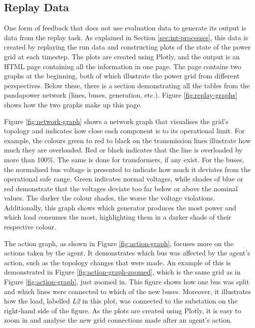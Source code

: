 \subsection{Replay Data}\label{ssec:replay-data}
One form of feedback that does not use evaluation data to generate its output is data from the replay task. As explained in Section \ref{sec:int-processes}, this data is created by replaying the run data and constructing plots of the state of the power grid at each timestep. The plots are created using Plotly, and the output is an HTML page containing all the information in one page. The page contains two graphs at the beginning, both of which illustrate the power grid from different perspectives. Below these, there is a section demonstrating all the tables from the pandapower network (lines, buses, generation, etc.). Figure \ref{fig:replay-graphs} shows how the two graphs make up this page.

Figure \ref{fig:network-graph} shows a network graph that visualises the grid's topology and indicates how close each component is to its operational limit. For example, the colours green to red to black on the transmission lines illustrate how much they are overloaded. Red or black indicates that the line is overloaded by more than 100\%. The same is done for transformers, if any exist. For the buses, the normalised bus voltage is presented to indicate how much it deviates from the operational safe range. Green indicates normal voltages, while shades of blue or red demonstrate that the voltages deviate too far below or above the nominal values. The darker the colour shades, the worse the voltage violations. Additionally, this graph shows which generator produces the most power and which load consumes the most, highlighting them in a darker shade of their respective colour.

The action graph, as shown in Figure \ref{fig:action-graph}, focuses more on the actions taken by the agent. It demonstrates which bus was affected by the agent's action, such as the topology changes that were made. An example of this is demonstrated in Figure \ref{fig:action-graph-zoomed}, which is the same grid as in Figure \ref{fig:action-graph}, just zoomed in. This figure shows how one bus was split and which lines were connected to which of the new buses. Moreover, it illustrates how the load, labelled \textit{L2} in this plot, was connected to the substation on the right-hand side of the figure. As the plots are created using Plotly, it is easy to zoom in and analyse the new grid connections made after an agent's action.

